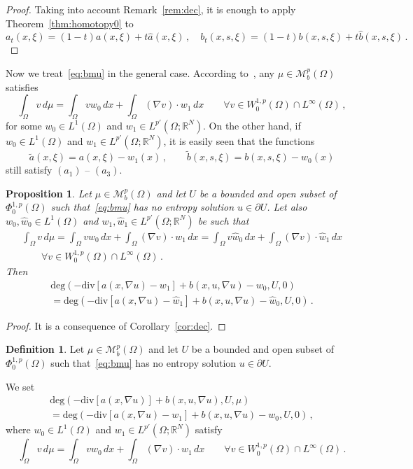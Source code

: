 \documentclass[twoside,reqno]{amsart}
\numberwithin{equation}{section}
\newtheorem{prop}[thm]{Proposition}
\theoremstyle{definition}
\newtheorem{defn}[thm]{Definition}
\newcommand{\R}{\mathbb{R}}
\begin{document}
%
\begin{proof}
Taking into account Remark~\ref{rem:dec}, it is enough
to apply Theorem~\ref{thm:homotopy0} to
\[
a_t(x,\xi) = (1-t)a(x,\xi) + t\hat{a}(x,\xi)\,,\quad
b_t(x,s,\xi) = (1-t)b(x,s,\xi) + t\hat{b}(x,s,\xi)\,.
\]
\end{proof}
%
Now we treat~\eqref{eq:bmu} in the general case.
According 
to~\cite{boccardo_gallouet_orsina1996},
any $\mu\in\mathcal{M}_b^p(\Omega)$ satisfies
\[
\int_\Omega v\,d\mu 
= \int_\Omega v w_0\,dx 
+\int_\Omega (\nabla v)\cdot w_1\,dx
\qquad\forall v\in W^{1,p}_0(\Omega)\cap L^\infty(\Omega)\,,
\]
for some $w_0\in L^1(\Omega)$ and 
$w_1\in L^{p'}(\Omega;\R^N)$.
On the other hand, if $w_0\in L^1(\Omega)$ and 
$w_1\in L^{p'}(\Omega;\R^N)$,
it is easily seen that the functions
\[
\tilde{a}(x,\xi) = a(x,\xi) - w_1(x)\,,\qquad
\tilde{b}(x,s,\xi) = b(x,s,\xi) - w_0(x)
\]
still satisfy $(a_1)$ -- $(a_3)$.
%
\begin{prop}
Let $\mu\in\mathcal{M}_b^p(\Omega)$ and let $U$ be a bounded 
and open subset of $\Phi^{1,p}_0(\Omega)$ such 
that~\eqref{eq:bmu}
has no entropy solution $u\in\partial U$.
Let also
$w_0, \hat{w}_0\in L^1(\Omega)$ and
$w_1, \hat{w}_1\in L^{p'}(\Omega;\R^N)$ be such that
\begin{multline*}
\int_\Omega v\,d\mu 
= \int_\Omega vw_0\,dx 
+\int_\Omega (\nabla v)\cdot w_1\,dx 
= \int_\Omega v\hat{w}_0\,dx 
+\int_\Omega (\nabla v)\cdot \hat{w}_1\,dx \\
\qquad\forall v\in W^{1,p}_0(\Omega)\cap L^\infty(\Omega)\,.
\end{multline*}
\indent
Then
\begin{multline*}
\mathrm{deg}(- \mathrm{div}[a(x,\nabla u)-w_1] 
+ b(x,u,\nabla u)-w_0,U,0) \\
= 
\mathrm{deg}(- \mathrm{div}[a(x,\nabla u)-\hat{w}_1] 
+ b(x,u,\nabla u) - \hat{w}_0,U,0)\,.
\end{multline*}
\end{prop}
%
\begin{proof}
It is a consequence of Corollary~\ref{cor:dec}.
\end{proof}
%
\begin{defn}
\label{defn:degree}
Let $\mu\in\mathcal{M}_b^p(\Omega)$ and let $U$ be a bounded 
and open subset of $\Phi^{1,p}_0(\Omega)$ such 
that~\eqref{eq:bmu}
has no entropy solution $u\in\partial U$.
\par
We set
\begin{multline*}
\mathrm{deg}(- \mathrm{div}[a(x,\nabla u)] 
+ b(x,u,\nabla u),U,\mu) \\
= \mathrm{deg}(- \mathrm{div}[a(x,\nabla u)-w_1] 
+ b(x,u,\nabla u)-w_0,U,0) \,,
\end{multline*}
where $w_0\in L^1(\Omega)$ and $w_1\in L^{p'}(\Omega;\R^N)$
satisfy
\[
\int_\Omega v\,d\mu 
= \int_\Omega vw_0\,dx 
+\int_\Omega (\nabla v)\cdot w_1\,dx 
\qquad\forall v\in W^{1,p}_0(\Omega)\cap L^\infty(\Omega)\,.
\]
\end{defn}
\end{document}
